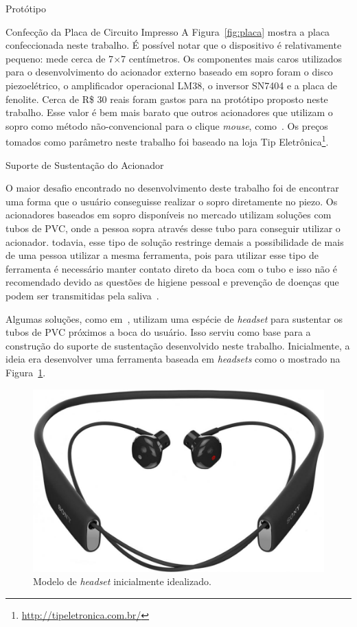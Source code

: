 \begin{chapter}{Protótipo}
\begin{section}{Confecção da Placa de Circuito Impresso}
A Figura~\ref{fig:placa} mostra a placa confeccionada neste trabalho. É possível
notar que o dispositivo é relativamente pequeno: mede cerca de 7$\times$7
centímetros. Os componentes mais caros utilizados para o desenvolvimento do
acionador externo baseado em sopro foram o disco piezoelétrico, o amplificador
operacional LM38, o inversor SN7404 e a placa de fenolite. Cerca de R\$ 30 reais
foram gastos para na protótipo proposto neste trabalho. Esse valor é bem mais
barato que outros acionadores que utilizam o sopro como método não-convencional
para o clique \textit{mouse}, como~\cite{SipPuff}. Os preços tomados como
parâmetro neste trabalho foi baseado na loja Tip
Eletrônica\footnote{\url{http://tipeletronica.com.br/}}. 

\end{section}


\begin{section}{Suporte de Sustentação do Acionador}

O maior desafio encontrado no desenvolvimento deste trabalho foi de encontrar
uma forma que o usuário conseguisse realizar o sopro diretamente no piezo. Os
acionadores baseados em sopro disponíveis no mercado utilizam soluções com tubos
de PVC, onde a pessoa sopra através desse tubo para conseguir utilizar o
acionador. todavia, esse tipo de solução restringe demais a possibilidade de
mais de uma pessoa utilizar a mesma ferramenta, pois para utilizar esse tipo de
ferramenta é necessário manter contato direto da boca com o tubo e isso não é
recomendado devido as questões de higiene pessoal e prevenção de doenças que
podem ser transmitidas pela saliva~\cite{Li2000}.

Algumas soluções, como em~\cite{CorpPuff}, utilizam uma espécie de 
\textit{headset} para sustentar os tubos de PVC próximos a boca do usuário. Isso
serviu como base para a construção do suporte de sustentação desenvolvido neste
trabalho. Inicialmente, a ideia era desenvolver uma ferramenta baseada em
\textit{headsets} como o mostrado na Figura~\ref{fig:headset}.

\begin{figure}[!h]
	\centering
	\begin{minipage}[c]{\textwidth}
	\centering
	\includegraphics[width=0.4\linewidth]{fig/heaset}
	\caption{Modelo de \textit{headset} inicialmente idealizado.}
	\label{fig:headset}
	\end{minipage}
\end{figure} 


\end{section}
\end{chapter}
